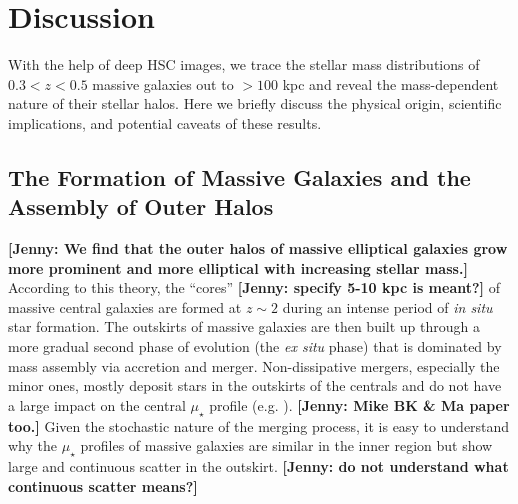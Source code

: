 \documentclass[a4paper,fleqn,usenatbib]{mnras}
\def\mden{{$\mu_{\star}$}}
\newcommand{\jenny}[1]{\textcolor{Bittersweet}{\textbf{[Jenny: #1]}}}
\begin{document}
\section{Discussion}
    \label{sec:discussion}
    
    With the help of deep HSC images, we trace the stellar mass distributions of 
    $0.3 < z < 0.5$ massive galaxies out to $>100$ kpc and reveal the mass-dependent nature 
    of their stellar halos.
    Here we briefly discuss the physical origin, scientific implications, and potential 
    caveats of these results. 
    

\subsection{The Formation of Massive Galaxies and the Assembly of Outer Halos}
    \label{ssec:twophase}
            
    \jenny{We find that the outer halos of massive elliptical galaxies grow more prominent and 
    more elliptical with increasing stellar mass.}
    According to this theory, the ``cores'' \jenny{specify 5-10 kpc is meant?} of massive central galaxies are formed 
    at $z{\sim} 2$ during an intense period of \textit{in situ} star formation. 
    The outskirts of massive galaxies are then built up through a more gradual second 
    phase of evolution (the \textit{ex situ} phase) that is dominated by mass assembly via 
    accretion and merger.
    Non-dissipative mergers, especially the minor ones, mostly deposit stars in the 
    outskirts of the centrals and do not have a large impact on the central \mden{} 
    profile (e.g. \citealt{Oogi2013, Bedorf2013}). \jenny{Mike BK \& Ma paper too.}
    Given the stochastic nature of the merging process, it is easy to understand why 
    the \mden{} profiles of massive galaxies are similar in the inner region but show
    large and continuous scatter in the outskirt. \jenny{do not understand what continuous 
    scatter means?}
    
\end{document}
